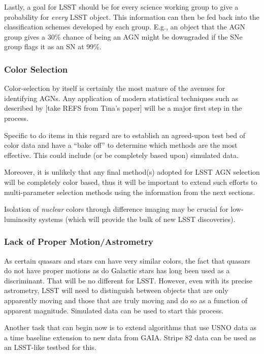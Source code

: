 Lastly, a goal for LSST should be for every science working group to give a probability for {\em every} LSST object.  This information can then be fed back into the classification schemes developed by each group.  E.g., an object that the AGN group gives a 30\% chance of being an AGN might be downgraded if the SNe group flags it as an SN at 99\%.

\subsubsection{Color Selection}

Color-selection by itself is certainly the most mature of the avenues
for identifying AGNs.  Any application of modern statistical
techniques such as described by [take REFS from Tina's paper] will be
a major first step in the process.  

Specific to do items in this regard are to establish an agreed-upon
test bed of color data and have a ``bake off'' to determine which
methods are the most effective.  This could include (or be completely
based upon) simulated data.  

Moreover, it is unlikely that any final method(s) adopted for LSST AGN
selection will be completely color based, thus it will be important to
extend such efforts to multi-parameter selection methods using the
information from the next sections.

Isolation of {\em nuclear} colors through difference imaging may be
crucial for low-luminosity systems (which will provide the bulk of new
LSST discoveries).

\subsubsection{Lack of Proper Motion/Astrometry}

As certain quasars and stars can have very similar colors, the fact
that quasars do not have proper motions as do Galactic stars has long
been used as a discriminant.  That will be no different for LSST.
However, even with its precise astrometry, LSST will need to
distinguish between objects that are only apparently moving and those that
are truly moving and do so as a function of apparent magnitude.
Simulated data can be used to start this process.

Another task that can begin now is to extend algorithms that use USNO
data as a time baseline extension to new data from GAIA.  Stripe 82
data can be used as an LSST-like testbed for this.

